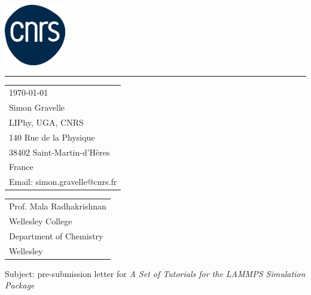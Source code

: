 \documentclass{article}
\begin{document}

\includegraphics[width=0.2\textwidth]{cnrs.png} %

\vspace{-1em} %

\rule{\linewidth}{1pt} %

\bigskip\bigskip %


\hfill
\begin{tabular}{l @{}}
	\today \bigskip\\ %
	Simon Gravelle \\
    LIPhy, UGA, CNRS \\
	140 Rue de la Physique \\
    38402 Saint-Martin-d'Hères \\
    France \\
	Email: simon.gravelle@cnrs.fr
\end{tabular}

\bigskip %


\begin{tabular}{@{} l}
	Prof. Mala Radhakrishnan \\
    Wellesley College \\
    Department of Chemistry \\
    Wellesley
\end{tabular}

\bigskip 

Subject: pre-submission letter for \textit{A Set of Tutorials for the LAMMPS Simulation Package}
\end{document}
